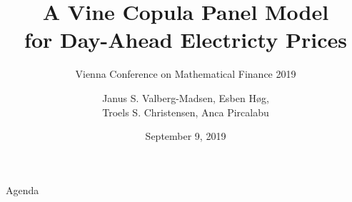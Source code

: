 \documentclass[10pt]{beamer}
\title{A Vine Copula Panel Model\\for Day-Ahead Electricty Prices}
\subtitle{Vienna Conference on Mathematical Finance 2019}
\author{
  Janus S. Valberg-Madsen,
  Esben Høg,\\
  Troels S. Christensen,
  Anca Pircalabu
}
\date{September 9, 2019}
\begin{document}
{\aauwavesbg
  \begin{frame}
    \titlepage
  \end{frame}
}

\begin{frame}{Agenda}{}
  \tableofcontents
\end{frame}
\end{document}
